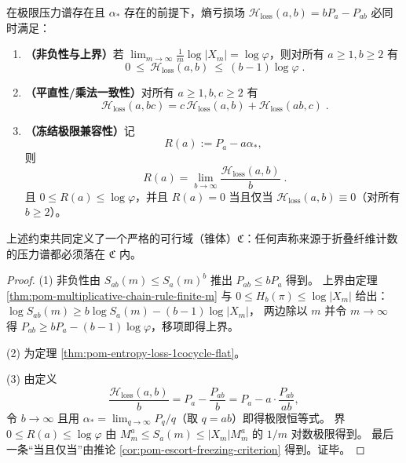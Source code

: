 \begin{theorem}\label{thm:pom-entropy-loss-feasibility-cone}
在极限压力谱存在且 \(\alpha_\ast\) 存在的前提下，熵亏损场 \(\mathcal{H}_{\mathrm{loss}}(a,b)=bP_a-P_{ab}\) 必同时满足：
\begin{enumerate}
  \item \textbf{（非负性与上界）}若 \(\lim_{m\to\infty}\frac{1}{m}\log|X_m|=\log\varphi\)，则对所有 \(a\ge 1,b\ge 2\) 有
  \[
  \boxed{\;
  0\ \le\ \mathcal{H}_{\mathrm{loss}}(a,b)\ \le\ (b-1)\log\varphi\; }.
  \]
  \item \textbf{（平直性/乘法一致性）}对所有 \(a\ge 1,b,c\ge 2\) 有
  \[
  \boxed{\;
  \mathcal{H}_{\mathrm{loss}}(a,bc)=c\,\mathcal{H}_{\mathrm{loss}}(a,b)+\mathcal{H}_{\mathrm{loss}}(ab,c)\; }.
  \]
  \item \textbf{（冻结极限兼容性）}记
  \[
  R(a):=P_a-a\alpha_\ast,
  \]
  则
  \[
  \boxed{\;
  R(a)=\lim_{b\to\infty}\frac{\mathcal{H}_{\mathrm{loss}}(a,b)}{b}\; }.
  \]
  且 \(0\le R(a)\le \log\varphi\)，并且 \(R(a)=0\) 当且仅当 \(\mathcal{H}_{\mathrm{loss}}(a,b)\equiv 0\)（对所有 \(b\ge 2\)）。
\end{enumerate}
上述约束共同定义了一个严格的可行域（锥体）\(\mathfrak{C}\)：任何声称来源于折叠纤维计数的压力谱都必须落在 \(\mathfrak{C}\) 内。
\end{theorem}
\begin{proof}
(1) 非负性由 \(S_{ab}(m)\le S_a(m)^b\) 推出 \(P_{ab}\le bP_a\) 得到。
上界由定理 \ref{thm:pom-multiplicative-chain-rule-finite-m} 与 \(0\le H_b(\pi)\le \log|X_m|\) 给出：
\(
\log S_{ab}(m)\ge b\log S_a(m)-(b-1)\log|X_m|
\)，
两边除以 \(m\) 并令 \(m\to\infty\) 得
\(
P_{ab}\ge bP_a-(b-1)\log\varphi
\)，移项即得上界。
\par
(2) 为定理 \ref{thm:pom-entropy-loss-1cocycle-flat}。
\par
(3) 由定义
\[
\frac{\mathcal{H}_{\mathrm{loss}}(a,b)}{b}
=
P_a-\frac{P_{ab}}{b}
=P_a-a\cdot\frac{P_{ab}}{ab},
\]
令 \(b\to\infty\) 且用 \(\alpha_\ast=\lim_{q\to\infty}P_q/q\)（取 \(q=ab\)）即得极限恒等式。
界 \(0\le R(a)\le\log\varphi\) 由 \(M_m^a\le S_a(m)\le |X_m|M_m^a\) 的 \(1/m\) 对数极限得到。
最后一条“当且仅当”由推论 \ref{cor:pom-escort-freezing-criterion} 得到。证毕。
\end{proof}
